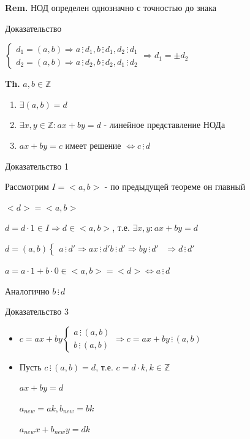 \documentclass[14pt, letter paper]{article}
\begin{document}
\textbf{Rem.} НОД определен однозначно с точностью до знака

\begin{center}
    Доказательство
\end{center}

$\begin{cases}
d_1 = (a, b) \Rightarrow a \, \vdots \, d_1, b \, \vdots \, d_1, d_2 \, \vdots \, d_1 \\
d_2 = (a, b) \Rightarrow a \, \vdots \, d_2, b \, \vdots \, d_2, d_1 \, \vdots \, d_2
\end{cases} \Rightarrow d_1 = \pm d_2$

\textbf{Th.} $a, b \in \mathbb{Z}$

\begin{enumerate}
    \item $\exists (a, b) = d$
    \item $\exists x, y \in \mathbb{Z}: ax + by = d$ - линейное представление НОДа
    \item $ax + by = c$ имеет решение $\Leftrightarrow c \, \vdots \, d$
\end{enumerate}

\begin{center}
    Доказательство 1
\end{center}

Рассмотрим $I = <a, b>$ - по предыдущей теореме он главный

$<d> = <a, b>$

$d = d \cdot 1 \in I \Rightarrow d \in <a, b>$, т.е. $\exists x, y : ax + by = d$

$d = (a, b) \begin{cases}
    a \, \vdots \, d' \Rightarrow ax \, \vdots \, d'
    b \, \vdots \, d' \Rightarrow by \, \vdots \, d'
\end{cases}$
$\Rightarrow d \, \vdots \, d'$

$a = a \cdot 1 + b \cdot 0 \in <a, b> = <d> \Leftrightarrow a \, \vdots \, d$

Аналогично $b \, \vdots \, d$

\begin{center}
    Доказательство 3
\end{center}

\begin{itemize}
    \item[$\Rightarrow$:] $c = ax + by \begin{cases} a \, \vdots \, (a, b) \\ b \, \vdots \, (a, b) \end{cases} \Rightarrow c = ax + by \, \vdots \, (a, b)$
    \item[$\Leftarrow$:] Пусть $c \, \vdots \, (a, b) = d$, т.е. $c = d \cdot k, k \in \mathbb{Z}$
    
    $ax + by = d$

    $a_{new} = ak, b_{new} = bk$ 

    $a_{new}x + b_{new}y = dk$
\end{itemize}
\end{document}

